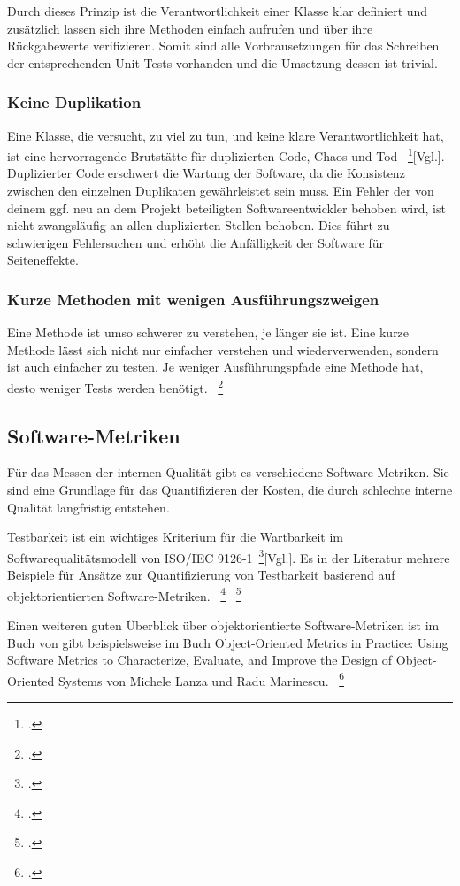 Durch dieses Prinzip ist die Verantwortlichkeit einer Klasse klar definiert und zusätzlich lassen sich ihre Methoden einfach aufrufen und über ihre Rückgabewerte verifizieren. Somit sind alle Vorbrausetzungen für das Schreiben der entsprechenden Unit-Tests vorhanden und die Umsetzung dessen ist trivial.

\subsubsection{Keine Duplikation}
Eine Klasse, die versucht, zu viel zu tun, und keine klare Verantwortlichkeit hat, ist eine
hervorragende Brutstätte für duplizierten Code, Chaos und Tod ~\footcite{Fowler.2000}[Vgl.]. Duplizierter Code erschwert die Wartung der Software, da die Konsistenz zwischen den einzelnen Duplikaten gewährleistet sein muss. Ein Fehler der von deinem ggf. neu an dem Projekt beteiligten Softwareentwickler behoben wird, ist nicht zwangsläufig an allen duplizierten Stellen behoben. Dies führt zu schwierigen Fehlersuchen und erhöht die Anfälligkeit der Software für Seiteneffekte. 

\subsubsection{Kurze Methoden mit wenigen Ausführungszweigen}
Eine Methode ist umso schwerer zu verstehen, je länger sie ist. Eine kurze Methode lässt
sich nicht nur einfacher verstehen und wiederverwenden, sondern ist auch einfacher zu
testen. Je weniger Ausführungspfade eine Methode hat, desto weniger Tests werden benötigt. ~\footcite[Vgl. Seite 9]{Bergmann.2013}

\subsection{Software-Metriken}\label{software-metriken}
Für das Messen der internen Qualität gibt es verschiedene Software-Metriken. Sie sind eine Grundlage für das Quantifizieren der Kosten, die durch schlechte interne Qualität langfristig entstehen.

Testbarkeit ist ein wichtiges Kriterium für die Wartbarkeit im Softwarequalitätsmodell von ISO/IEC 9126-1~\footcite{ISOIEC91261}[Vgl.]. Es in der Literatur mehrere Beispiele für Ansätze zur Quantifizierung von Testbarkeit basierend auf objektorientierten Software-Metriken. ~\footcite[Vgl. Seite 136-145]{Bruntink.2004} ~\footcite[Vgl. Seite 1 - 6]{Khan.2009}

Einen weiteren guten Überblick über objektorientierte Software-Metriken ist im Buch von gibt beispielsweise im Buch \dq{}Object-Oriented Metrics in Practice: Using Software Metrics to Characterize, Evaluate, and Improve the Design of Object-Oriented Systems\dq{} von Michele Lanza und Radu Marinescu. ~\footcite[Vgl.]{Lanza.2006}

